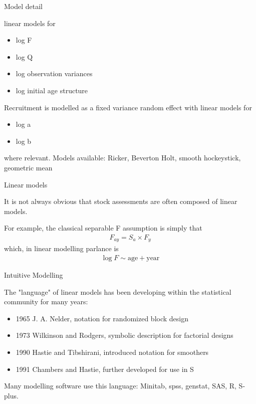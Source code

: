 \documentclass{beamer}\usepackage[]{graphicx}\usepackage[]{color}
\begin{document}
\begin{frame}{Model detail}

linear models for
\begin{itemize}
  \item log F
  \item log Q
  \item log observation variances
  \item log initial age structure  
\end{itemize}

Recruitment is modelled as a \alert{fixed variance} random effect with linear models for
\begin{itemize}
  \item log a
  \item log b
\end{itemize}
where relevant.  Models available: Ricker, Beverton Holt, smooth hockeystick, geometric mean
\end{frame} 

\begin{frame}{Linear models}

It is not always obvious that stock assessments are often composed of linear models.

For example, the classical separable F assumption is simply that
\begin{align*}
F_{ay} = S_a \times F_y 
\end{align*}
which, in linear modelling parlance is
\begin{align*}
\log F \sim \text{age} + \text{year} 
\end{align*}

\end{frame}

\begin{frame}{Intuitive Modelling}

The "language" of linear models has been developing within the statistical community for many years:

  \begin{itemize}
  \item 1965 J. A. Nelder, notation for randomized block design
  \item 1973 Wilkinson and Rodgers, symbolic description for factorial designs
  \item 1990 Hastie and Tibshirani, introduced notation for smoothers
  \item 1991 Chambers and Hastie, further developed for use in S
  \end{itemize}

Many modelling software use this language:  Minitab, spss, genstat, SAS, R, S-plus.

\end{frame}
\end{document}
